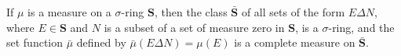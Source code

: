 If $\mu$ is a measure on a $\sigma$-ring $\mathbf{S}$, then the class $\bar{\mathbf{S}}$ of all sets of the form $E \Delta N$, where $E \in \mathbf{S}$ and $N$ is a subset of a set of measure zero in $\mathbf{S}$, is a $\sigma$-ring, and the set function $\bar{\mu}$ defined by $\bar{\mu}(E \Delta N) = \mu(E)$ is a complete measure on $\bar{\mathbf{S}}$.
